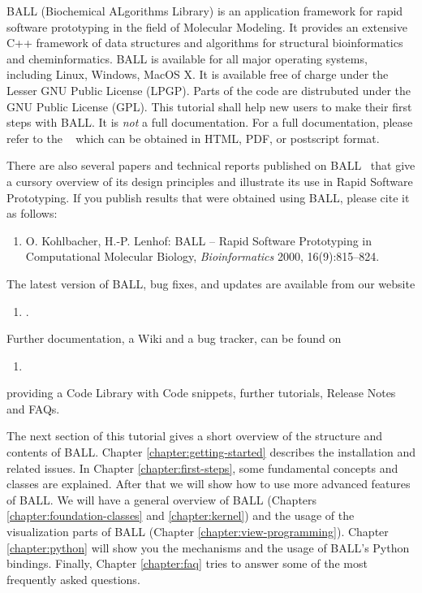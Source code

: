 \noindent
BALL (Biochemical ALgorithms Library) is an application framework for rapid
software prototyping in the field of Molecular Modeling.
It provides an extensive C++ framework of data structures and algorithms for
structural bioinformatics and cheminformatics.
BALL is available for all major operating systems, including Linux, Windows, MacOS X.
It is available free of charge under the Lesser GNU Public License (LPGP).
Parts of the code are distrubuted under the GNU Public License (GPL).
This tutorial shall help new users to make their first steps with BALL.
It is {\em not} a full documentation. For a full documentation, please refer to the ~\cite{BALL-RM} which can be obtained in HTML, PDF, or postscript format.

There are also several papers and technical reports published on
BALL~\cite{BKL99a,BKL99b,KL99,Koh2001,KL2000,MHLK05,MHLK06}
that give a cursory overview of its design principles and illustrate its use in
Rapid Software Prototyping. If you publish results that were obtained using 
BALL, please cite it as follows:
\begin{enumerate}
  \item[] O. Kohlbacher, H.-P. Lenhof: BALL -- Rapid Software Prototyping
          in Computational Molecular Biology, {\em Bioinformatics} 2000,
          16(9):815--824.
\end{enumerate}

\noindent
The latest version of BALL, bug fixes, and updates are available from our 
website

\begin{enumerate}
  \item[] .
\end{enumerate}

\noindent
Further documentation, a Wiki and a bug tracker, can be found on 

\begin{enumerate}
  \item[] 
\end{enumerate}
providing a Code Library with Code snippets, further tutorials, Release Notes and FAQs.


The next section of this tutorial gives a short overview of the structure and
contents of BALL. Chapter \ref{chapter:getting-started} describes the
installation and related issues. In Chapter \ref{chapter:first-steps}, some
fundamental concepts and classes are explained. After that we will show how to
use more advanced features of BALL. We will have a general overview of BALL 
 (Chapters \ref{chapter:foundation-classes} and  \ref{chapter:kernel}) 
and the usage of the visualization parts of BALL (Chapter \ref{chapter:view-programming}). 
Chapter \ref{chapter:python} will show you
the mechanisms and the usage of BALL's Python bindings.  Finally, Chapter
\ref{chapter:faq} tries to answer some of the most frequently asked questions.

